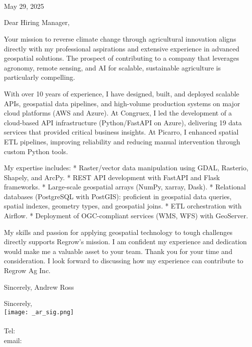 \documentclass[letterpaper]{article}
\begin{document}
\large
\JobManager \\
\JobManagerTitle \\
\textbf{\JobCompany} \\

\null\hfill May 29, 2025

Dear Hiring Manager,

Your mission to reverse climate change through agricultural innovation aligns directly with my professional aspirations and extensive experience in advanced geospatial solutions.  The prospect of contributing to a company that leverages agronomy, remote sensing, and AI for scalable, sustainable agriculture is particularly compelling.

With over 10 years of experience, I have designed, built, and deployed scalable APIs, geospatial data pipelines, and high-volume production systems on major cloud platforms (AWS and Azure). At Congruex, I led the development of a cloud-based API infrastructure (Python/FastAPI on Azure), delivering 19 data services that provided critical business insights. At Picarro, I enhanced spatial ETL pipelines, improving reliability and reducing manual intervention through custom Python tools.

My expertise includes:
 * Raster/vector data manipulation using GDAL, Rasterio, Shapely, and ArcPy.
 * REST API development with FastAPI and Flask frameworks.
 * Large-scale geospatial arrays (NumPy, xarray, Dask).
 * Relational databases (PostgreSQL with PostGIS): proficient in geospatial data queries, spatial indexes, geometry types, and geospatial joins.
 * ETL orchestration with Airflow.
 * Deployment of OGC-compliant services (WMS, WFS) with GeoServer.

My skills and passion for applying geospatial technology to tough
challenges directly supports Regrow’s mission. I am confident my experience and dedication would make me a valuable asset to your team. Thank you for your time and consideration. I look forward to discussing how my experience can contribute to Regrow Ag Inc.

Sincerely,
Andrew Ross



Sincerely,\\
    \hspace{1em}
    \texttt{[image: \_ar\_sig.png]} \\
    \CVsigname \\
    \small
    Tel: \CVphone \\
    email: \CVemail
\end{document}
